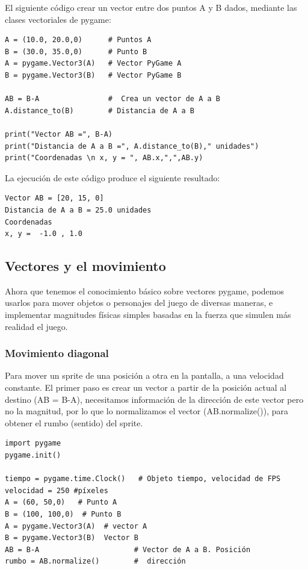 {El siguiente código crear un vector entre dos puntos {\ttfamily A} y {\ttfamily B} dados,  mediante las clases vectoriales de pygame:
\begin{lstlisting}
A = (10.0, 20.0,0)      # Puntos A
B = (30.0, 35.0,0)      # Punto B
A = pygame.Vector3(A)   # Vector PyGame A
B = pygame.Vector3(B)   # Vector PyGame B

AB = B-A                #  Crea un vector de A a B
A.distance_to(B)        # Distancia de A a B

print("Vector AB =", B-A)
print("Distancia de A a B =", A.distance_to(B)," unidades")
print("Coordenadas \n x, y = ", AB.x,",",AB.y)
\end{lstlisting}

La ejecución de este código  produce el siguiente resultado:
{\ttfamily\scriptsize\scriptsize 
	\hspace{-0.65cm} \vspace{-0.3cm}	
	{\color{blue}
\begin{verbatim}	
Vector AB = [20, 15, 0]
Distancia de A a B = 25.0 unidades
Coordenadas 
x, y =  -1.0 , 1.0	
\end{verbatim}
}}


\subsection{Vectores y el movimiento}

Ahora que tenemos el conocimiento básico sobre vectores pygame, podemos usarlos para mover objetos o personajes del juego 
de diversas maneras, e implementar magnitudes físicas simples basadas en la fuerza que simulen más realidad el juego.

\subsubsection{Movimiento diagonal}  %
	
Para mover un sprite de una posición a otra  en la pantalla, a una velocidad constante.   
El primer paso es crear un vector a partir de la posición actual al destino ({\ttfamily AB = B-A}), necesitamos 
información de la dirección de este vector pero no la magnitud, por lo que lo normalizamos el vector ({\ttfamily AB.normalize()}), para
obtener el rumbo (sentido) del sprite.  
\begin{lstlisting}	
import pygame	
pygame.init()

tiempo = pygame.time.Clock()   # Objeto tiempo, velocidad de FPS	
velocidad = 250	#píxeles
A = (60, 50,0)   # Punto A
B = (100, 100,0)  # Punto B
A = pygame.Vector3(A)  # vector A
B = pygame.Vector3(B)  Vector B
AB = B-A                      # Vector de A a B. Posición
rumbo = AB.normalize()        #  dirección 
\end{lstlisting}

}

